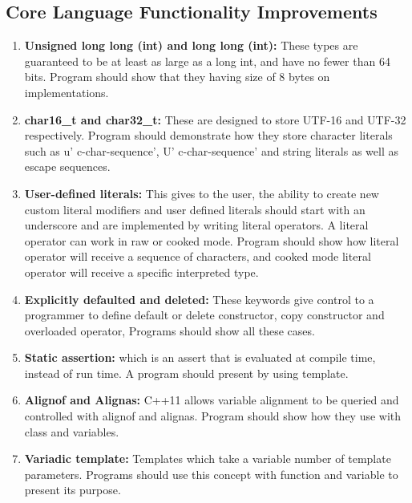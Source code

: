 \documentclass[11pt]{report}
\begin{document}
\subsection{Core Language Functionality Improvements}
\begin{enumerate}
\item \textbf{Unsigned long long (int) and long long (int):} These types are \linebreak guaranteed to be at least as large as a long int, and have no fewer than 64 bits. Program should show that they having size of 8 bytes on \linebreak implementations.

\item \textbf{char16\_t and char32\_t:} These are designed to store UTF-16 and \linebreak UTF-32 respectively. Program should demonstrate how they \linebreak store character literals such as u' c-char-sequence', U' c-char-sequence' and string literals as well as escape sequences.

\item \textbf{User-defined literals:} This gives to the user, the ability to create new custom literal modifiers and  user defined literals should start with an underscore and are implemented by writing literal operators. A literal operator can work in raw or cooked mode. Program should show how literal operator will receive a sequence of characters, and cooked mode literal operator will receive a specific interpreted type.

\item \textbf{Explicitly defaulted and deleted:} These keywords give control to a programmer to define default or delete constructor, copy constructor and overloaded operator, Programs should show all these cases.

\item \textbf{Static assertion:} which is an assert that is evaluated at compile time, instead of run time. A program should present by using template.

\item \textbf{Alignof and Alignas:} C++11 allows variable alignment to be queried and controlled with alignof and alignas. Program should show how they use with class and variables.

\item \textbf{Variadic template:} Templates which take a variable number of template parameters. Programs should use this concept with function and variable to present its purpose.
\end{enumerate}
\end{document}
